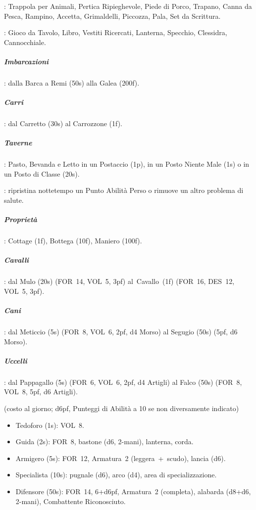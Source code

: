 \documentclass[itdr]{subfiles}
\begin{document}
: Trappola per Animali, Pertica Ripieghevole, Piede di Porco, Trapano, Canna da Pesca, Rampino, Accetta, Grimaldelli, Piccozza, Pala, Set da Scrittura.

: Gioco da Tavolo, Libro, Vestiti Ricercati, Lanterna, Specchio, Clessidra, Cannocchiale.

\vfill

\subparagraph{Imbarcazioni}: dalla Barca a Remi (50s) alla Galea (200f).

\subparagraph{Carri}: dal Carretto (30s) al Carrozzone (1f).

\subparagraph{Taverne}: Pasto, Bevanda e Letto in un Postaccio (1p), in un Posto Niente Male (1s) o in un Posto di Classe (20s).

: ripristina nottetempo un Punto Abilità Perso o rimuove un altro problema di salute.

\subparagraph{Proprietà}: Cottage (1f), Bottega (10f), Maniero (100f).

\subparagraph{Cavalli}: dal Mulo (20s) (FOR~14, VOL~5, 3pf) al~Cavallo~(1f) (FOR~16, DES~12, VOL~5, 3pf).

\subparagraph{Cani}: dal Meticcio (5s) (FOR~8, VOL~6, 2pf, d4 Morso) al Segugio (50s) (5pf, d6 Morso).

\subparagraph{Uccelli}: dal Pappagallo (5s) (FOR~6, VOL~6, 2pf, d4 Artigli) al Falco (50s) (FOR~8, VOL~8, 5pf, d6 Artigli).

\vfill

 (costo al giorno; d6pf, Punteggi di Abilità a 10
se non diversamente indicato)

\begin{itemize}
	\item Tedoforo (1s): VOL~8.
	\item Guida (2s): FOR~8, bastone (d6, 2-mani), lanterna, corda.
	\item Armigero (5s): FOR~12, Armatura~2 \mbox{(leggera + scudo)}, lancia (d6).
	\item Specialista (10s): pugnale (d6), arco (d4), area di specializzazione.
	\item Difensore (50s): FOR~14, 6+d6pf, Armatura~2 (completa), alabarda (d8+d6, 2-mani), Combattente Riconosciuto.
\end{itemize}


\end{document}
